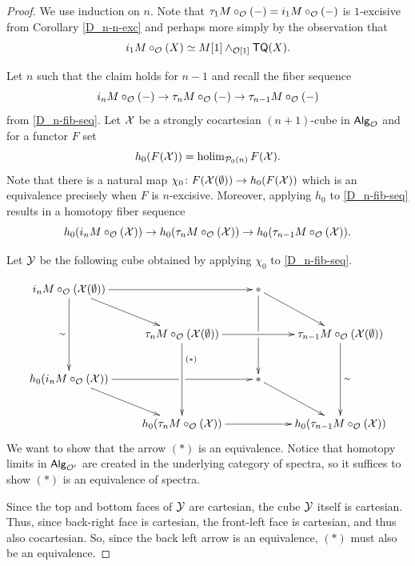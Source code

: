 \begin{proof}
    We use induction on $n$. Note that $\tau_1M \circ_{\mathcal{O}}(-)=i_1M\circ_{\mathcal{O}}(-)$ is $1$-excisive from Corollary \ref{D_n-n-exc} and perhaps more simply by the observation that \[i_1M\circ_{\mathcal{O}}(X)\simeq M[1] \wedge_{\mathcal{O}[1]} \mathsf{TQ}(X).\]
    
    Let $n$ such that the claim holds for $n-1$ and recall the fiber sequence \[ i_n M \circ_{\mathcal{O}} (-) \to \tau_n M \circ_{\mathcal{O}}(-) \to \tau_{n-1} M \circ_{\mathcal{O}} (-)\] from \eqref{D_n-fib-seq}. Let $\mathcal{X}$ be a strongly cocartesian $(n+1)$-cube in ${\mathsf{Alg}_{\mathcal{O}}}$ and for a functor $F$ set \[ 
        h_0 (F(\mathcal{X})) = \operatorname{holim}_{\mathcal{P}_0(n)} F(\mathcal{X}).\] 
    Note that there is a natural map $\chi_0\colon F(\mathcal{X}(\emptyset))\to h_0 (F(\mathcal{X}))$ which is an equivalence precisely when $F$ is $n$-excisive. Moreover, applying $h_0$ to \eqref{D_n-fib-seq} results in a homotopy fiber sequence \[h_0(i_n M \circ_{\mathcal{O}} (\mathcal{X})) \to h_0(\tau_n M \circ_{\mathcal{O}}(\mathcal{X})) \to h_0(\tau_{n-1} M \circ_{\mathcal{O}} (\mathcal{X})). \] 
    
    Let $\mathcal{Y}$ be the following cube obtained by applying $\chi_0$ to \eqref{D_n-fib-seq}.
    
    \[ \xymatrix{
        i_n M \circ_{\Cal{O}} (\Cal{X}(\emptyset)) \ar[rr] \ar[dr] \ar[dd]_-{\sim}
        & &
        {*} \ar[dr] \ar[dd]|!{[d]}\hole
        &\\
        &
        \tau_n M\circ_{\Cal{O}} (\Cal{X}(\emptyset)) \ar[rr] \ar[dd]^<(.2){(*)}
        &&
        \tau_{n-1}M \circ_{\Cal{O}} (\Cal{X} (\emptyset)) \ar[dd]^-{\sim}
        \\
        h_0 (i_n M \circ_{\Cal{O}} (\Cal{X})) \ar[rr]|!{[r]}\hole \ar[dr]
        & &
        {*} \ar[dr] 
        &\\
        &
        h_0 (\tau_n M\circ_{\Cal{O}} (\Cal{X})) \ar[rr] 
        &&
        h_0(\tau_{n-1} M\circ_{\Cal{O}} (\Cal{X})) 
    }\]
    We want to show that the arrow $(*)$ is an equivalence. Notice that homotopy limits in ${\mathsf{Alg}_{\mathcal{O'}}}$ are created in the underlying category of spectra, so it suffices to show $(*)$ is an equivalence of spectra. 
    
    Since the top and bottom faces of $\mathcal{Y}$ are cartesian, the cube $\mathcal{Y}$ itself is cartesian. Thus, since back-right face is cartesian, the front-left face is cartesian, and thus also cocartesian. So, since the back left arrow is an equivalence, $(*)$ must also be an equivalence. 
\end{proof}

